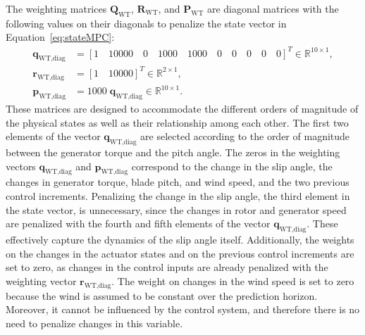The weighting matrices \( \bm{Q}_{\text{WT}} \), \( \bm{R}_{\text{WT}} \), and \( \bm{P}_{\text{WT}} \) are diagonal matrices with the following values on their diagonals to penalize the state vector in Equation~\eqref{eq:stateMPC}:
\begin{align}
    \bm{q}_{\text{WT,diag}} &= [1 \quad 10000 \quad 0 \quad 1000 \quad 1000 \quad 0 \quad 0 \quad 0 \quad 0 \quad 0]^T \in \mathbb{R}^{10 \times 1}, \\
    \bm{r}_{\text{WT,diag}} &= [1 \quad 10000]^T \in \mathbb{R}^{2 \times 1}, \\
    \bm{p}_{\text{WT,diag}} &= 1000 \; \bm{q}_{\text{WT,diag}} \in \mathbb{R}^{10 \times 1}.
\end{align}
%
These matrices are designed to accommodate the different orders of magnitude of the physical states as well as their relationship among each other. The first two elements of the vector $\bm{q}_{\text{WT,diag}}$ are selected according to the order of magnitude between the generator torque and the pitch angle. The zeros in the weighting vectors $\bm{q}_{\text{WT,diag}}$ and $\bm{p}_{\text{WT,diag}}$ correspond to the change in the slip angle, the changes in generator torque, blade pitch, and wind speed, and the two previous control increments. Penalizing the change in the slip angle, the third element in the state vector, is unnecessary, since the changes in rotor and generator speed are penalized with the fourth and fifth elements of the vector $\bm{q}_{\text{WT,diag}}$. These effectively capture the dynamics of the slip angle itself. Additionally, the weights on the changes in the actuator states and on the previous control increments are set to zero, as changes in the control inputs are already penalized with the weighting vector $\bm{r}_{\text{WT,diag}}$. The weight on changes in the wind speed is set to zero because the wind is assumed to be constant over the prediction horizon. Moreover, it cannot be influenced by the control system, and therefore there is no need to penalize changes in this variable.

